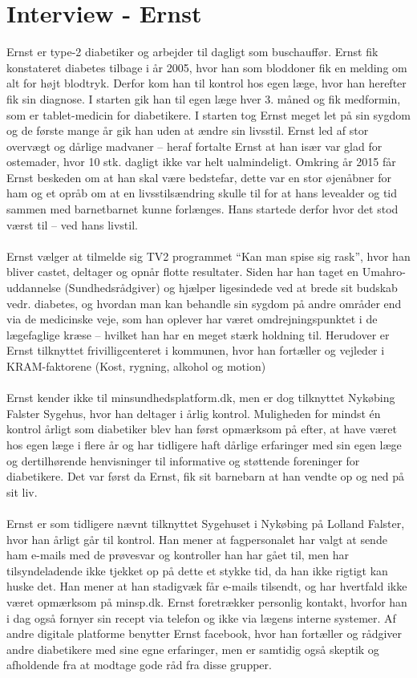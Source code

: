 \documentclass[english]{article}
\begin{document}
\section*{Interview - Ernst}
Ernst er type-2 diabetiker og arbejder til dagligt som buschauffør. Ernst fik konstateret diabetes tilbage i år 2005, hvor han som bloddoner fik en melding om alt for højt blodtryk. Derfor kom han  til kontrol hos egen læge, hvor han herefter fik sin diagnose.
I starten gik han til egen læge hver 3. måned og fik medformin, som er tablet-medicin for diabetikere. I starten tog Ernst meget let på sin sygdom og de første mange år gik han uden at ændre sin livsstil. Ernst led af stor overvægt og dårlige madvaner – heraf fortalte Ernst at han især var glad for ostemader, hvor 10 stk. dagligt ikke var helt ualmindeligt.
Omkring år 2015 får Ernst beskeden om at han skal være bedstefar, dette var en stor øjenåbner for ham og et opråb om at en livsstilsændring skulle til for at hans levealder og tid sammen med barnetbarnet kunne forlænges. Hans startede derfor hvor det stod værst til – ved hans livstil.
\\ \\
Ernst vælger at tilmelde sig TV2 programmet “Kan man spise sig rask”, hvor han bliver castet, deltager og opnår flotte resultater. Siden har han taget en Umahro-uddannelse (Sundhedsrådgiver) og hjælper ligesindede ved at brede sit budskab vedr. diabetes, og hvordan man kan behandle sin sygdom på andre områder end via de medicinske veje, som han oplever har været omdrejningspunktet i de lægefaglige kræse – hvilket han har en meget stærk holdning til. Herudover er Ernst tilknyttet frivilligcenteret i kommunen, hvor han fortæller og vejleder i KRAM-faktorene (Kost, rygning, alkohol og motion)
\\ \\
Ernst kender ikke til minsundhedsplatform.dk, men er dog tilknyttet Nykøbing Falster Sygehus, hvor han deltager i årlig kontrol. Muligheden for mindst én kontrol årligt som diabetiker blev han først opmærksom på efter, at have været hos egen læge i flere år og har tidligere haft dårlige erfaringer med sin egen læge og dertilhørende henvisninger til informative og støttende foreninger for diabetikere. Det var først da Ernst, fik sit barnebarn at han vendte op og ned på sit liv. 
\\ \\
Ernst er som tidligere nævnt tilknyttet Sygehuset i Nykøbing på Lolland Falster, hvor han årligt går til kontrol. Han mener at fagpersonalet har valgt at sende ham e-mails med de prøvesvar og kontroller han har gået til, men har tilsyndeladende ikke tjekket op på dette et stykke tid, da han ikke rigtigt kan huske det. Han mener at han stadigvæk får e-mails tilsendt, og har hvertfald ikke været opmærksom på minsp.dk. Ernst foretrækker personlig kontakt, hvorfor han i dag også fornyer sin recept via telefon og ikke via lægens interne systemer. Af andre digitale platforme benytter Ernst facebook, hvor han fortæller og rådgiver andre diabetikere med sine egne erfaringer, men er samtidig også skeptik og afholdende fra at modtage gode råd fra disse grupper.
\end{document}
